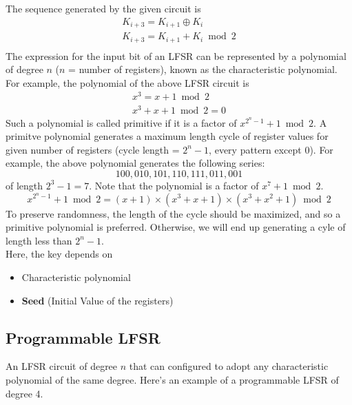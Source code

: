 \documentclass[english, 11pt]{article}
\begin{document}
The sequence generated by the given circuit is 
\begin{gather*}
    K_{i+3} = K_{i+1} \oplus K_{i} \\
    K_{i+3} = K_{i+1} + K_{i} \bmod 2\\
\end{gather*}
The expression for the input bit of an LFSR can be represented by a polynomial of degree $n$ ($n$ = number of registers), known as the characteristic polynomial. For example, the polynomial of the above LFSR circuit is
\begin{gather*}
x^{3} = x + 1 \bmod 2 \\
x^{3} + x + 1 \bmod 2 =0
\end{gather*}
Such a polynomial is called primitive if it is a factor of $x^{2^{n}-1}+1 \bmod 2$. A primitve polynomial generates a maximum length cycle of register values for given number of registers (cycle length = $2^{n}-1$, every pattern except 0). For example, the above polynomial generates the following series:\\
\[
100, 010, 101, 110, 111, 011, 001 
\]
of length $2^{3}-1 = 7$. Note that the polynomial is a factor of $x^{7}+1 \bmod 2$.
\[x^{2^{n}-1}+1 \bmod 2 = (x + 1)\times (x^{3} + x + 1)\times (x^{3} + x^{2} + 1)\bmod 2\]
To preserve randomness, the length of the cycle should be maximized, and so a primitive polynomial is preferred. Otherwise, we will end up generating a cyle of length less than $2^{n}-1$.\\

Here, the key depends on 
\begin{itemize}
    \item Characteristic polynomial
    \item \textbf{Seed} (Initial Value of the registers)
\end{itemize}

\subsection*{Programmable LFSR}
An LFSR circuit of degree $n$ that can configured to adopt any characteristic polynomial of the same degree. Here's an example of a programmable LFSR of degree 4.
\end{document}
